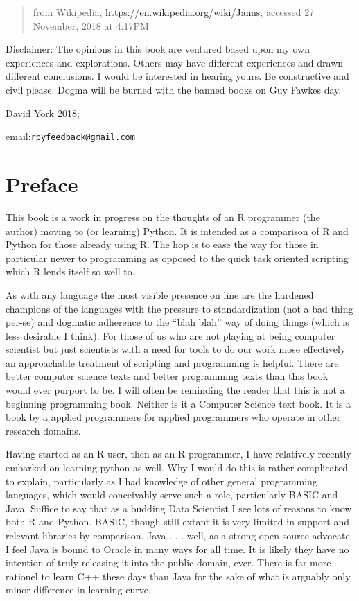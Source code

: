 \documentclass[]{book}
\theoremstyle{definition}
\theoremstyle{definition}
\theoremstyle{definition}
\theoremstyle{remark}
\begin{document}
\begin{quote}
from Wikipedia, \url{https://en.wikipedia.org/wiki/Janus}, accessed 27
November, 2018 at 4:17PM
\end{quote}

Disclaimer: The opinions in this book are ventured based upon my own
experiences and explorations. Others may have different experiences and
drawn different conclusions. I would be interested in hearing yours. Be
constructive and civil please. Dogma will be burned with the banned
books on Guy Fawkes day.

David York 2018;

email:\href{mailto:rpyfeedback@gmail.com}{\nolinkurl{rpyfeedback@gmail.com}}

\section{Preface}\label{preface}

This book is a work in progress on the thoughts of an R programmer (the
author) moving to (or learning) Python. It is intended as a comparison
of R and Python for those already using R. The hop is to ease the way
for those in particular newer to programming as opposed to the quick
task oriented scripting which R lends itself so well to.

As with any language the most visible presence on line are the hardened
champions of the languages with the pressure to standardization (not a
bad thing per-se) and dogmatic adherence to the ``blah blah'' way of
doing things (which is less desirable I think). For those of us who are
not playing at being computer scientist but just scientists with a need
for tools to do our work mose effectively an approachable treatment of
scripting and programming is helpful. There are better computer science
texts and better programming texts than this book would ever purport to
be. I will often be reminding the reader that this is not a beginning
programming book. Neither is it a Computer Science text book. It is a
book by a applied programmers for applied programmers who operate in
other research domains.

Having started as an R user, then as an R programmer, I have relatively
recently embarked on learning python as well. Why I would do this is
rather complicated to explain, particularly as I had knowledge of other
general programming languages, which would conceivably serve such a
role, particularly BASIC and Java. Suffice to say that as a budding Data
Scientist I see lots of reasons to know both R and Python. BASIC, though
still extant it is very limited in support and relevant libraries by
comparison. Java . . . well, as a strong open source advocate I feel
Java is bound to Oracle in many ways for all time. It is likely they
have no intention of truly releasing it into the public domain, ever.
There is far more rationel to learn C++ these days than Java for the
sake of what is arguably only minor difference in learning curve.
\end{document}
